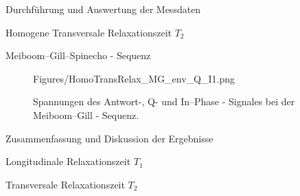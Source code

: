 \documentclass[pdftex, a4paper,11pt, twoside, ngerman]{report}
\begin{document}
\begin{chapter}{Durchführung und Auswertung der Messdaten}
\begin{section}{
        Homogene Transversale Relaxationszeit $T_{2}$}
\begin{subsection}{Meiboom--Gill--Spinecho - Sequenz}
\begin{figure}[htb]
\begin{minipage}{.48\textwidth}
            {Figures/HomoTransRelax_MG_env_Q_I1.png}
            \caption{Spannungen des Antwort-, Q- und
              In--Phase - Signales bei der Meiboom--Gill - Sequenz.}
            \label{figMG_envQI1}
          \end{minipage}
        \end{figure}
        
      \end{subsection}
      
    \end{section}
    
    
    
    \newpage
    \begin{section}{Zusammenfassung und Diskussion der Ergebnisse}
      \label{chpAuswertungDiskussion}
      
      
      \begin{subsection}
        {Longitudinale Relaxationszeit $T_{1}$}
        \label{chpAuswertungDiskussionLong}
        
        
      \end{subsection}
      
      
      
      \begin{subsection}
        {Transversale Relaxationszeit $T_{2}$}
        \label{chpAuswertungDiskussionTrans}
        
        
      \end{subsection}
      
    \end{section}
   
  \end{chapter}
  
  
  
  
  
  
  
  \begin{thebibliography}{99}
    \scriptsize
    
  \end{thebibliography}
 
\end{document}
